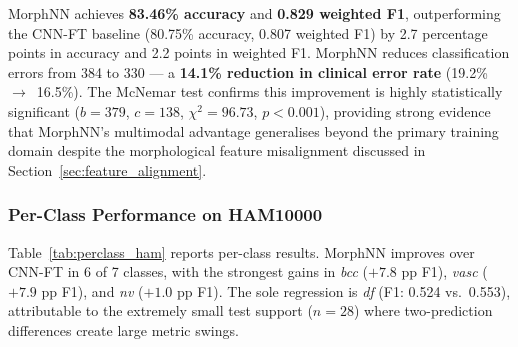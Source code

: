 \documentclass[preprint,12pt]{elsarticle}
\begin{document}
MorphNN achieves \textbf{83.46\% accuracy} and \textbf{0.829 weighted F1},
outperforming the CNN-FT baseline (80.75\% accuracy, 0.807 weighted F1)
by 2.7 percentage points in accuracy and 2.2 points in weighted F1.
MorphNN reduces classification errors from 384 to 330 --- a
\textbf{14.1\% reduction in clinical error rate} (19.2\%~$\to$~16.5\%).
The McNemar test confirms this improvement is highly statistically
significant ($b = 379$, $c = 138$, $\chi^2 = 96.73$, $p < 0.001$),
providing strong evidence that MorphNN's multimodal advantage
generalises beyond the primary training domain despite the morphological
feature misalignment discussed in Section~\ref{sec:feature_alignment}.


\subsubsection{Per-Class Performance on HAM10000}

Table~\ref{tab:perclass_ham} reports per-class results.  MorphNN
improves over CNN-FT in 6 of 7 classes, with the strongest gains in
\textit{bcc} ($+7.8$ pp F1), \textit{vasc} ($+7.9$ pp F1), and \textit{nv}
($+1.0$ pp F1).  The sole regression is \textit{df} (F1: 0.524 vs.\ 0.553),
attributable to the extremely small test support ($n = 28$) where
two-prediction differences create large metric swings.
\end{document}
